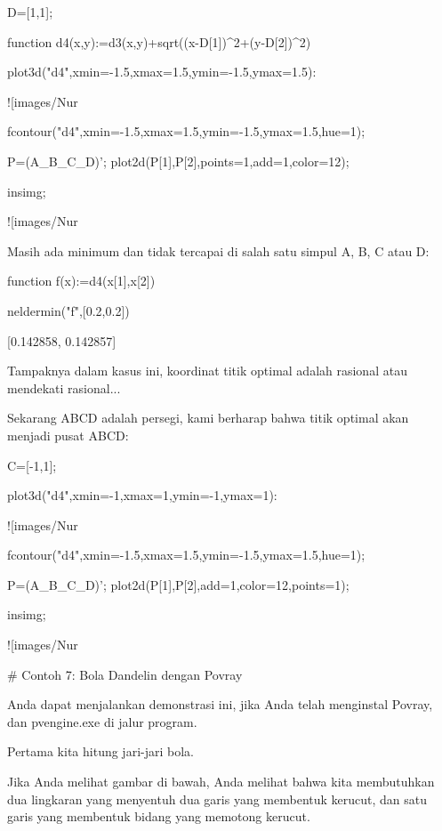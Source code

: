 \documentclass{article}
\begin{document}
\>D=[1,1];

\>function d4(x,y):=d3(x,y)+sqrt((x-D[1])^2+(y-D[2])^2)

\>plot3d("d4",xmin=-1.5,xmax=1.5,ymin=-1.5,ymax=1.5):


![images/Nur%

\>fcontour("d4",xmin=-1.5,xmax=1.5,ymin=-1.5,ymax=1.5,hue=1);

\>P=(A\_B\_C\_D)'; plot2d(P[1],P[2],points=1,add=1,color=12);

\>insimg;


![images/Nur%

Masih ada minimum dan tidak tercapai di salah satu simpul A, B, C atau
D:


\>function f(x):=d4(x[1],x[2])

\>neldermin("f",[0.2,0.2])


    [0.142858,  0.142857]

Tampaknya dalam kasus ini, koordinat titik optimal adalah rasional
atau mendekati rasional...


Sekarang ABCD adalah persegi, kami berharap bahwa titik optimal akan
menjadi pusat ABCD:


\>C=[-1,1];

\>plot3d("d4",xmin=-1,xmax=1,ymin=-1,ymax=1):


![images/Nur%

\>fcontour("d4",xmin=-1.5,xmax=1.5,ymin=-1.5,ymax=1.5,hue=1);

\>P=(A\_B\_C\_D)'; plot2d(P[1],P[2],add=1,color=12,points=1);

\>insimg;


![images/Nur%

# Contoh 7: Bola Dandelin dengan Povray

Anda dapat menjalankan demonstrasi ini, jika Anda telah menginstal
Povray, dan pvengine.exe di jalur program.


Pertama kita hitung jari-jari bola.


Jika Anda melihat gambar di bawah, Anda melihat bahwa kita membutuhkan
dua lingkaran yang menyentuh dua garis yang membentuk kerucut, dan
satu garis yang membentuk bidang yang memotong kerucut.
\end{document}
